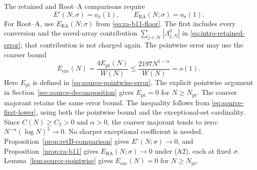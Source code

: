The retained and Root--A comparisons require
\begin{equation}\label{eq:bill-eventual-errors}
 E'(N;\sigma)=o_\sigma(1),\qquad
 E_{\mathrm{RA}}(N;\sigma)=o_\sigma(1).
\end{equation}
For Root--A, use $E_{\mathrm{RA}}(N;\sigma)$
from \eqref{eq:ra-b11-floor}.
The first includes every conversion and the saved-array contribution
$\sum_{j\in\mathcal H}|\Lambda^0_{j,N}|$ in
\eqref{eq:intro-retained-error}; that contribution is not charged again.
The pointwise error may use the coarser bound
\begin{equation}\label{eq:bill-pointwise-error}
 E_{\mathrm{exc}}(N)=\frac{4E_{\mathrm{pt}}(N)}{W(N)}
 \le\frac{2197N^{1-\alpha}}{W(N)}=o(1).
\end{equation}
Here $E_{\mathrm{pt}}$ is defined in
\eqref{eq:source-pointwise-error}. The explicit pointwise argument in
Section~\ref{sec:source-decomposition} gives $E_{\mathrm{pt}}=0$
for $N\ge N_{\mathrm{pt}}$. The coarser majorant retains the same error bound.
The inequality follows from \eqref{eq:source-first-lower}, using both
the pointwise bound and the exceptional-set cardinality.
Since $C(N)\ge C_2>0$ and $\alpha>0$, the coarser majorant tends to zero:
$N^{-\alpha}(\log N)^2\to0$.
No sharper exceptional coefficient is needed.
Proposition~\ref{prop:retB-comparison} gives $E'(N;\sigma)\to0$, and
Proposition~\ref{prop:ra-b11} gives $E_{\mathrm{RA}}(N;\sigma)\to0$ under
\textup{(A2)}, each at fixed $\sigma$.
Lemma~\ref{lem:source-pointwise} gives $E_{\mathrm{exc}}(N)=0$ for
$N\ge N_{\mathrm{pt}}$.

